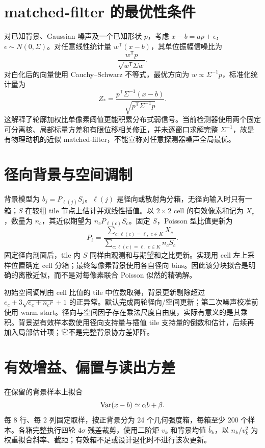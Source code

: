 \section{matched-filter 的最优性条件}
对已知背景、Gaussian 噪声及一个已知形状 $p$，考虑 $x-b=ap+\epsilon$，$\epsilon\sim N(0,\Sigma)$。对任意线性统计量 $w^{\mathsf T}(x-b)$，其单位振幅信噪比为
\begin{equation}
\frac{w^{\mathsf T}p}{\sqrt{w^{\mathsf T}\Sigma w}}.
\end{equation}
对白化后的向量使用 Cauchy--Schwarz 不等式，最优方向为 $w\propto\Sigma^{-1}p$，标准化统计量为
\begin{equation}
Z_*=\frac{p^{\mathsf T}\Sigma^{-1}(x-b)}{\sqrt{p^{\mathsf T}\Sigma^{-1}p}}.
\end{equation}
这解释了轮廓加权比单像素阈值更能积累分布式弱信号。当前检测器使用两个固定可分离核、局部标量方差和有限位移相关修正，并未逐窗口求解完整 $\Sigma^{-1}$，故是有物理动机的近似 matched-filter，不能宣称对任意探测器噪声全局最优。
\section{径向背景与空间调制}
背景模型为 $b_j=P_{\ell(j)}S_j$。$\ell(j)$ 是径向或散射角分箱，无径向输入时只有一箱；$S$ 在较粗 tile 节点上估计并双线性插值。以 $2\times2$ cell 的有效像素和记为 $X_c$，数量为 $n_c$，其近似期望为 $n_cP_{\ell(c)}S_c$。固定 $S$，Poisson 型比值更新为
\begin{equation}
P_\ell=\frac{\sum_{c:\ell(c)=\ell,\;c\in K}X_c}{\sum_{c:\ell(c)=\ell,\;c\in K}n_cS_c}.
\end{equation}
固定径向剖面后，tile 内 $S$ 同样由观测和与期望和之比更新。实现用 cell 左上采样位置确定 cell 分箱；最终每像素背景使用各自径向 bins。因此该分块拟合是明确的离散近似，而不是对每像素联合 Poisson 似然的精确解。

初始空间调制由 cell 比值的 tile 中位数取得，背景更新剔除超过 $e_c+3\sqrt{e_c+n_cr}+1$ 的正异常。默认完成两轮径向/空间更新；第二次噪声校准前使用 warm start。径向与空间因子存在乘法尺度自由度，实际有意义的是其乘积。背景逆有效样本数使用径向支持量与插值 tile 支持量的倒数和估计，后续再加入局部估计项；它不是完整背景协方差矩阵。
\section{有效增益、偏置与读出方差}
在保留的背景样本上拟合
\begin{equation}
\operatorname{Var}(x-b)\simeq\alpha b+\beta.
\end{equation}
每 8 行、每 2 列固定取样，按正背景分为 24 个几何强度箱，每箱至少 200 个样本。各箱完整执行四轮 $4\sigma$ 残差裁剪，使用二阶矩 $v_k$ 和背景均值 $\bar b_k$，以 $n_k/v_k^2$ 为权重拟合斜率、截距；有效箱不足或设计退化时不进行该次更新。

